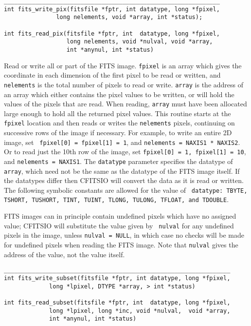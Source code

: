 \documentclass[11pt]{article}
\begin{document}
\begin{verbatim}
______________________________________________________________
int fits_write_pix(fitsfile *fptr, int datatype, long *fpixel,
               long nelements, void *array, int *status);

int fits_read_pix(fitsfile *fptr, int  datatype, long *fpixel, 
                  long nelements, void *nulval, void *array, 
                  int *anynul, int *status)
\end{verbatim}

Read or write all or part of the FITS image.  {\tt fpixel} is an array
which gives the coordinate in each dimension of the first pixel to be
read or written, and {\tt nelements} is the total number of pixels to
read or write.  {\tt array} is the address of an array which either
contains the pixel values to be written, or will hold the values of the
pixels that are read.  When reading, {\tt array} must have been
allocated large enough to hold all the returned pixel values.  This
routine starts at the {\tt fpixel} location and then reads or writes
the {\tt nelements} pixels, continuing on successive rows of the image
if necessary.  For example, to write an entire 2D image, set {\tt
fpixel[0] = fpixel[1] = 1}, and {\tt nelements = NAXIS1 * NAXIS2}.  Or
to read just the 10th row of the image, set {\tt fpixel[0] = 1,
fpixel[1] = 10}, and {\tt nelements = NAXIS1}.  The {\tt datatype}
parameter specifies the datatype of {\tt array}, which need not be the
same as the datatype of the FITS image itself.  If the datatypes differ
then CFITSIO will convert the data as it is read or written.  The
following symbolic constants are allowed for the value of {\tt
datatype:  TBYTE, TSHORT, TUSHORT, TINT, TUINT, TLONG, TULONG, TFLOAT,
and TDOUBLE}.

FITS images can in principle contain undefined pixels which have no
assigned value;  CFITSIO will substitute the value given by {\tt
nulval}  for  any undefined pixels in the image, unless {\tt nulval =
NULL}, in which case no checks will be made for undefined pixels when
reading the FITS image. Note that {\tt nulval} gives the address of the
value, not the value itself.

\begin{verbatim}
_________________________________________________________________
int fits_write_subset(fitsfile *fptr, int datatype, long *fpixel,
             long *lpixel, DTYPE *array, > int *status)

int fits_read_subset(fitsfile *fptr, int  datatype, long *fpixel,
             long *lpixel, long *inc, void *nulval,  void *array,
             int *anynul, int *status)
\end{verbatim}
\end{document}
